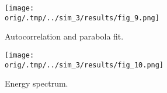 \begin{figure}[h!]
\centering
\texttt{[image: \\orig/.tmp/../sim\_3/results/fig\_9.png]}
\caption{Autocorrelation and parabola fit.}
\label{fig9}
\end{figure}

\begin{figure}[h!]
\centering
\texttt{[image: \\orig/.tmp/../sim\_3/results/fig\_10.png]}
\caption{Energy spectrum.}
\label{fig10}
\end{figure}


